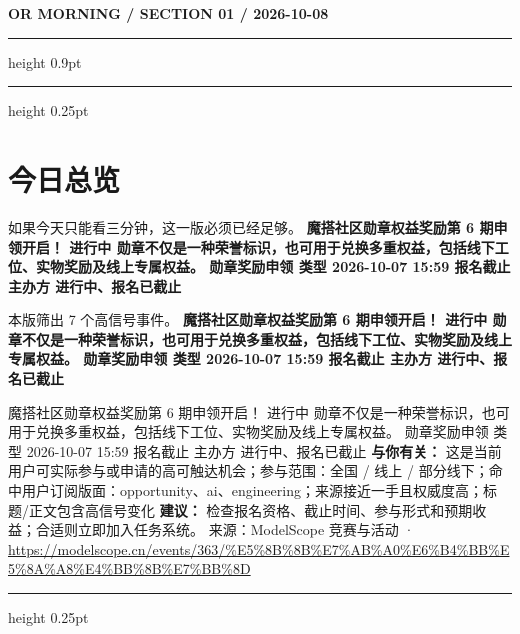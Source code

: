 \documentclass[10.5pt]{ctexart}
\begin{document}
{\small\bfseries OR MORNING / SECTION 01 / 2026-10-08}
\vspace{2mm}
\hrule height 0.9pt
\vspace{1.5mm}
\hrule height 0.25pt
\vspace{4mm}
\section*{今日总览}
{\color{ormuted} 如果今天只能看三分钟，这一版必须已经足够。}
\vspace{2mm}
{\fontsize{25}{29}\selectfont\bfseries 魔搭社区勋章权益奖励第 6 期申领开启！ 进行中 勋章不仅是一种荣誉标识，也可用于兑换多重权益，包括线下工位、实物奖励及线上专属权益。 勋章奖励申领 类型 2026-10-07 15:59 报名截止 主办方 进行中、报名已截止}\par
\vspace{2mm}
{\large 本版筛出 7 个高信号事件。}
\vspace{3mm}
{\Large\bfseries 魔搭社区勋章权益奖励第 6 期申领开启！ 进行中 勋章不仅是一种荣誉标识，也可用于兑换多重权益，包括线下工位、实物奖励及线上专属权益。 勋章奖励申领 类型 2026-10-07 15:59 报名截止 主办方 进行中、报名已截止}\par
魔搭社区勋章权益奖励第 6 期申领开启！ 进行中 勋章不仅是一种荣誉标识，也可用于兑换多重权益，包括线下工位、实物奖励及线上专属权益。 勋章奖励申领 类型 2026-10-07 15:59 报名截止 主办方 进行中、报名已截止
\textbf{与你有关：} 这是当前用户可实际参与或申请的高可触达机会；参与范围：全国 / 线上 / 部分线下；命中用户订阅版面：opportunity、ai、engineering；来源接近一手且权威度高；标题/正文包含高信号变化
\textbf{建议：} 检查报名资格、截止时间、参与形式和预期收益；合适则立即加入任务系统。
{\footnotesize\color{ormuted} 来源：ModelScope 竞赛与活动 · \url{https://modelscope.cn/events/363/%E5%8B%8B%E7%AB%A0%E6%B4%BB%E5%8A%A8%E4%BB%8B%E7%BB%8D}}
\vspace{3mm}
\hrule height 0.25pt
\vspace{3mm}
\end{document}
